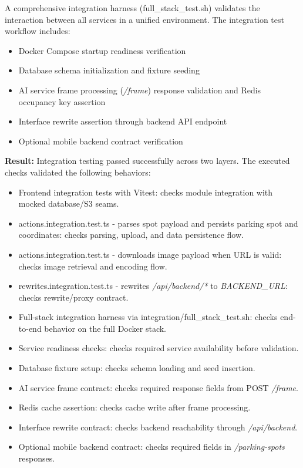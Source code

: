 A comprehensive integration harness (full\_stack\_test.sh) validates the interaction between all services in a unified environment. The integration test workflow includes:

\begin{itemize}
    \item Docker Compose startup readiness verification
    \item Database schema initialization and fixture seeding
    \item AI service frame processing (\textit{/frame}) response validation and Redis occupancy key assertion
    \item Interface rewrite assertion through backend API endpoint
    \item Optional mobile backend contract verification
\end{itemize}

\noindent\textbf{Result:} Integration testing passed successfully across two layers. The executed checks validated the following behaviors:
\begin{itemize}
    \item Frontend integration tests with Vitest: checks module integration with mocked database/S3 seams.
    \item actions.integration.test.ts - parses spot payload and persists parking spot and coordinates: checks parsing, upload, and data persistence flow.
    \item actions.integration.test.ts - downloads image payload when URL is valid: checks image retrieval and encoding flow.
    \item rewrites.integration.test.ts - rewrites \textit{/api/backend/*} to \textit{BACKEND\_URL}: checks rewrite/proxy contract.
    \item Full-stack integration harness via integration/full\_stack\_test.sh: checks end-to-end behavior on the full Docker stack.
    \item Service readiness checks: checks required service availability before validation.
    \item Database fixture setup: checks schema loading and seed insertion.
    \item AI service frame contract: checks required response fields from POST \textit{/frame}.
    \item Redis cache assertion: checks cache write after frame processing.
    \item Interface rewrite contract: checks backend reachability through \textit{/api/backend}.
    \item Optional mobile backend contract: checks required fields in \textit{/parking-spots} responses.
\end{itemize}

